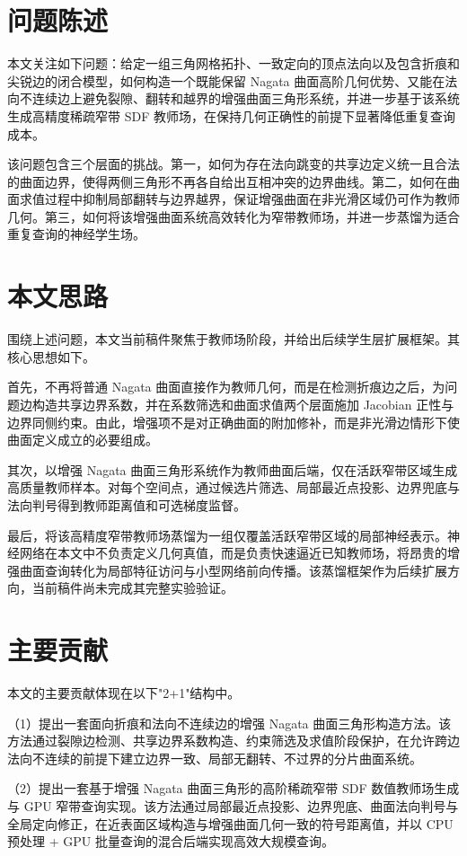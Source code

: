 \documentclass[12pt,oneside]{ctexbook}
\begin{document}
\section{问题陈述}
本文关注如下问题：给定一组三角网格拓扑、一致定向的顶点法向以及包含折痕和尖锐边的闭合模型，如何构造一个既能保留 Nagata 曲面高阶几何优势、又能在法向不连续边上避免裂隙、翻转和越界的增强曲面三角形系统，并进一步基于该系统生成高精度稀疏窄带 SDF 教师场，在保持几何正确性的前提下显著降低重复查询成本。

该问题包含三个层面的挑战。第一，如何为存在法向跳变的共享边定义统一且合法的曲面边界，使得两侧三角形不再各自给出互相冲突的边界曲线。第二，如何在曲面求值过程中抑制局部翻转与边界越界，保证增强曲面在非光滑区域仍可作为教师几何。第三，如何将该增强曲面系统高效转化为窄带教师场，并进一步蒸馏为适合重复查询的神经学生场。

\section{本文思路}
围绕上述问题，本文当前稿件聚焦于教师场阶段，并给出后续学生层扩展框架。其核心思想如下。

首先，不再将普通 Nagata 曲面直接作为教师几何，而是在检测折痕边之后，为问题边构造共享边界系数，并在系数筛选和曲面求值两个层面施加 Jacobian 正性与边界同侧约束。由此，增强项不是对正确曲面的附加修补，而是非光滑边情形下使曲面定义成立的必要组成。

其次，以增强 Nagata 曲面三角形系统作为教师曲面后端，仅在活跃窄带区域生成高质量教师样本。对每个空间点，通过候选片筛选、局部最近点投影、边界兜底与法向判号得到教师距离值和可选梯度监督。

最后，将该高精度窄带教师场蒸馏为一组仅覆盖活跃窄带区域的局部神经表示。神经网络在本文中不负责定义几何真值，而是负责快速逼近已知教师场，将昂贵的增强曲面查询转化为局部特征访问与小型网络前向传播。该蒸馏框架作为后续扩展方向，当前稿件尚未完成其完整实验验证。

\section{主要贡献}
本文的主要贡献体现在以下"2+1"结构中。

（1）提出一套面向折痕和法向不连续边的增强 Nagata 曲面三角形构造方法。该方法通过裂隙边检测、共享边界系数构造、约束筛选及求值阶段保护，在允许跨边法向不连续的前提下建立边界一致、局部无翻转、不过界的分片曲面系统。

（2）提出一套基于增强 Nagata 曲面三角形的高阶稀疏窄带 SDF 数值教师场生成与 GPU 窄带查询实现。该方法通过局部最近点投影、边界兜底、曲面法向判号与全局定向修正，在近表面区域构造与增强曲面几何一致的符号距离值，并以 CPU 预处理 + GPU 批量查询的混合后端实现高效大规模查询。
\end{document}
